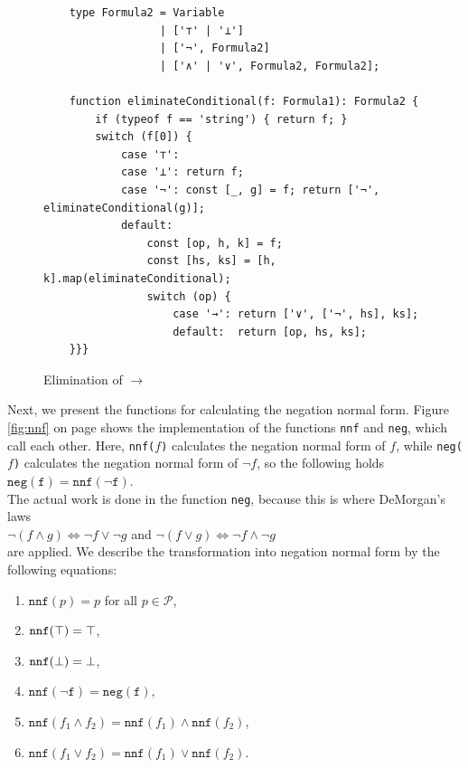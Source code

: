 \begin{figure}[!ht]
  \centering
\begin{verbatim}
    type Formula2 = Variable 
                  | ['⊤' | '⊥'] 
                  | ['¬', Formula2]
                  | ['∧' | '∨', Formula2, Formula2];
                  
    function eliminateConditional(f: Formula1): Formula2 {
        if (typeof f == 'string') { return f; }
        switch (f[0]) {
            case '⊤':
            case '⊥': return f;
            case '¬': const [_, g] = f; return ['¬', eliminateConditional(g)]; 
            default: 
                const [op, h, k] = f;
                const [hs, ks] = [h, k].map(eliminateConditional);
                switch (op) {
                    case '→': return ['∨', ['¬', hs], ks];
                    default:  return [op, hs, ks];                              
    }}}
\end{verbatim}
\vspace*{-0.3cm}
  \caption{Elimination of $\rightarrow$}
  \label{fig:eliminate-folgt}
\end{figure}
\pagebreak
Next, we present the functions for calculating the negation normal form.
Figure
\ref{fig:nnf} on page \pageref{fig:nnf} shows the implementation of the functions
\texttt{nnf} and \texttt{neg},
which call each other.  Here, \texttt{nnf($f$)} calculates the negation normal form of $f$, while  
\texttt{neg($f$)} calculates the negation normal form of $\neg f$, so the following holds
\\[0.2cm]
\hspace*{1.3cm}
$\texttt{neg}(\texttt{f}) = \texttt{nnf}(\neg \texttt{f})$.
\\[0.2cm]
 The actual work is done in the
function \texttt{neg}, because this is where DeMorgan's laws 
\\[0.2cm]
\hspace*{1.3cm}
$\neg (f \wedge g) \Leftrightarrow \neg f \vee \neg g$ \quad and \quad 
$\neg (f \vee g) \Leftrightarrow \neg f \wedge \neg g$ 
\\[0.2cm]
are applied.  We describe the transformation into negation normal form by 
the following equations: 
\begin{enumerate}
\item $\texttt{nnf}(p) = p$ \quad for all $p \in \mathcal{P}$,
\item $\texttt{nnf}(\top) = \top$,
\item $\texttt{nnf}(\bot) = \bot$,
\item $\texttt{nnf}(\neg \texttt{f}) = \texttt{neg}(\texttt{f})$,
\item $\texttt{nnf}(f_1 \wedge f_2) = \texttt{nnf}(f_1) \wedge \texttt{nnf}(f_2)$,
\item $\texttt{nnf}(f_1 \vee f_2) = \texttt{nnf}(f_1) \vee \texttt{nnf}(f_2)$.
\end{enumerate}

